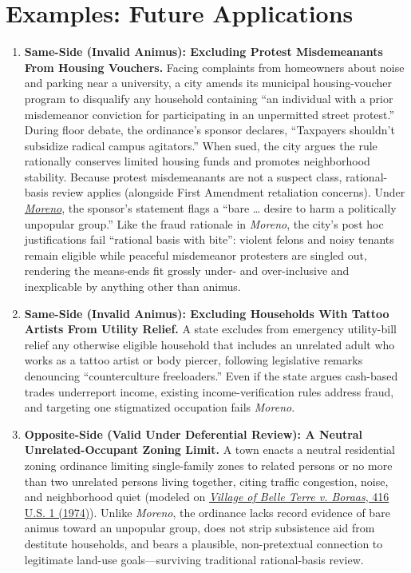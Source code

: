 \documentclass[12pt]{article}
\begin{document}
\section{Examples: Future Applications}
\begin{enumerate}

\item \textbf{Same-Side (Invalid Animus): Excluding Protest Misdemeanants From Housing Vouchers.} Facing complaints from homeowners about noise and parking near a university, a city amends its municipal housing-voucher program to disqualify any household containing ``an individual with a prior misdemeanor conviction for participating in an unpermitted street protest.'' During floor debate, the ordinance's sponsor declares, ``Taxpayers shouldn't subsidize radical campus agitators.'' When sued, the city argues the rule rationally conserves limited housing funds and promotes neighborhood stability. Because protest misdemeanants are not a suspect class, rational-basis review applies (alongside First Amendment retaliation concerns). Under \href{https://supreme.justia.com/cases/federal/us/413/528/}{\textit{Moreno}}, the sponsor's statement flags a ``bare \dots{} desire to harm a politically unpopular group.'' Like the fraud rationale in \textit{Moreno}, the city's post hoc justifications fail ``rational basis with bite'': violent felons and noisy tenants remain eligible while peaceful misdemeanor protesters are singled out, rendering the means-ends fit grossly under- and over-inclusive and inexplicable by anything other than animus.

\item \textbf{Same-Side (Invalid Animus): Excluding Households With Tattoo Artists From Utility Relief.} A state excludes from emergency utility-bill relief any otherwise eligible household that includes an unrelated adult who works as a tattoo artist or body piercer, following legislative remarks denouncing ``counterculture freeloaders.'' Even if the state argues cash-based trades underreport income, existing income-verification rules address fraud, and targeting one stigmatized occupation fails \textit{Moreno}.

\item \textbf{Opposite-Side (Valid Under Deferential Review): A Neutral Unrelated-Occupant Zoning Limit.} A town enacts a neutral residential zoning ordinance limiting single-family zones to related persons or no more than two unrelated persons living together, citing traffic congestion, noise, and neighborhood quiet (modeled on \href{https://supreme.justia.com/cases/federal/us/416/1/}{\textit{Village of Belle Terre v. Boraas}, 416 U.S. 1 (1974)}). Unlike \textit{Moreno}, the ordinance lacks record evidence of bare animus toward an unpopular group, does not strip subsistence aid from destitute households, and bears a plausible, non-pretextual connection to legitimate land-use goals---surviving traditional rational-basis review.


\end{enumerate}
\end{document}
